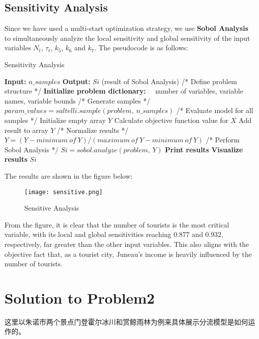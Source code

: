 \documentclass[12pt]{article}  %
\begin{document}
\subsection{Sensitivity Analysis}
Since we have used a multi-start optimization strategy, we use \textbf{Sobol Analysis} to simultaneously analyze the local sensitivity and global sensitivity of the input variables $N_t$, $\tau_t$, $k_5$, $k_6$ and $k_7$. The pseudocode is as follows:
\begin{algorithm}
	\caption{Sensitivity Analysis}
	\begin{algorithmic}[1]
		\STATE \textbf{Input:} $n\_samples$
		\STATE \textbf{Output:} $Si$ (result of Sobol Analysis)
		\vspace{0.2cm}
		\STATE /* Define problem structure */
		\STATE \textbf{Initialize problem dictionary:}
		\STATE $\quad$number of variables, variable names, variable bounds
		\STATE /* Generate samples */
		\STATE $param\_values = saltelli.sample(problem,\ n\_samples)$
		\STATE /* Evaluate model for all samples */
		\STATE Initialize empty array $Y$
		\STATE Calculate objective function value for $X$
		\STATE Add result to array $Y$
		\ENDFOR
		\STATE /* Normalize results */
		\STATE $Y = (Y - minimum\ of\ Y) / (maximum\ of\ Y - minimum\ of\ Y)$
		\STATE /* Perform Sobol Analysis */
		\STATE $Si=sobol.analyze(problem,\ Y)$
		\vspace{0.2cm}
		\STATE \textbf{Print results}
		\STATE \textbf{Visualize results}
		\vspace{0.2cm}
		\RETURN $Si$
	\end{algorithmic}
\end{algorithm}

The results are shown in the figure below:
\begin{figure}[H]
	\centering
	\texttt{[image: sensitive.png]}
	\caption{Sensitive Analysis}\label{fig:sensitive}
\end{figure}

From the figure, it is clear that the number of tourists is the most critical variable, with its local and global sensitivities reaching $0.877$ and $0.932$, respectively, far greater than the other input variables. This also aligns with the objective fact that, as a tourist city, Juneau's income is heavily influenced by the number of tourists.

\section{Solution to Problem2}
这里以朱诺市两个景点门登霍尔冰川和赏鲸雨林为例来具体展示分流模型是如何运作的。
\end{document}
